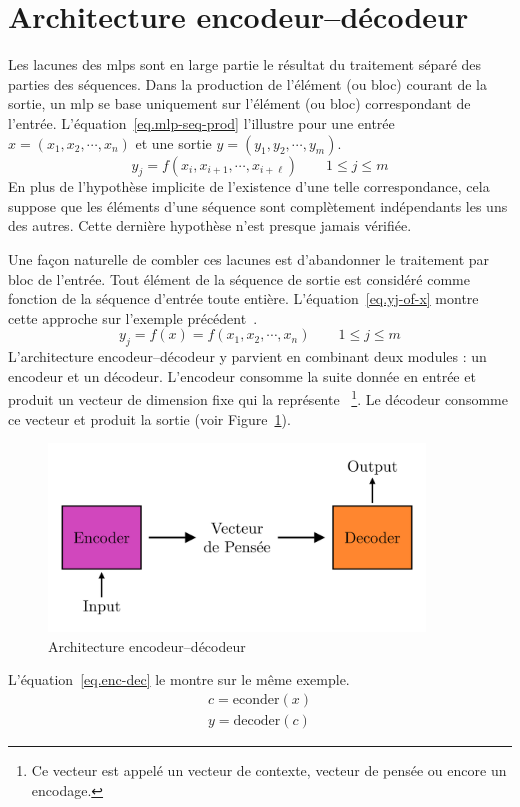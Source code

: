 \section{Architecture encodeur--décodeur}

Les lacunes des \glspl{mlp} sont en large partie le résultat du traitement séparé des parties des séquences.
Dans la production de l'élément (ou bloc) courant de la sortie,
un \gls{mlp} se base uniquement sur l'élément (ou bloc) correspondant de l'entrée.
L'équation~\ref{eq.mlp-seq-prod} l'illustre pour une entrée \(x = (x_1, x_2, \cdots, x_n)\)
et une sortie \(y = (y_1, y_2, \cdots, y_m)\).
\begin{equation}
    \label{eq.mlp-seq-prod}
    y_j = f(x_i, x_{i+1}, \cdots, x_{i+\ell}) \qquad 1 \le j \le m
\end{equation}
En plus de l'hypothèse implicite de l'existence d'une telle correspondance,
cela suppose que les éléments d'une séquence sont complètement indépendants les uns des autres.
Cette dernière hypothèse n'est presque jamais vérifiée. 

Une façon naturelle de combler ces lacunes est d'abandonner le traitement par bloc de l'entrée.
Tout élément de la séquence de sortie est considéré comme fonction de la séquence d'entrée toute entière.
L'équation~\ref{eq.yj-of-x} montre cette approche sur l'exemple précédent~\cite{Stahlberg_2020}.
\begin{equation}
    \label{eq.yj-of-x}
    y_j = f(x) = f(x_1, x_2, \cdots, x_n) \qquad 1 \le j \le m
\end{equation}
L'architecture encodeur--décodeur y parvient en combinant deux modules : un encodeur et un décodeur.
L'encodeur consomme la suite donnée en entrée et produit un vecteur de dimension fixe qui la représente%
~\footnote{Ce vecteur est appelé un vecteur de contexte, vecteur de pensée ou encore un encodage.}.
Le décodeur consomme ce vecteur et produit la sortie (voir Figure~\ref{fig.encoder-decoder}).
\begin{figure}[hbt]
    \centering
    \includegraphics[width=10cm]{assets/images/encoder-decoder.png}
    \caption{Architecture encodeur--décodeur}
    \label{fig.encoder-decoder}
\end{figure}
L'équation~\ref{eq.enc-dec} le montre sur le même exemple.
\begin{equation}
    \label{eq.enc-dec}
    \begin{array}{l}
        c = \mathrm{econder}(x)\\
        y = \mathrm{decoder}(c)
    \end{array}
\end{equation}

